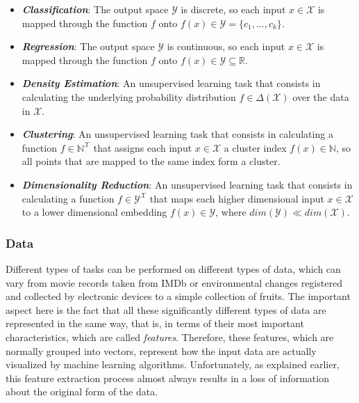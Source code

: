 \begin{itemize}
      \item \emph{\textbf{Classification}}: The output space $\mathcal{Y}$ is
            discrete, so each input $x \in \mathcal{X}$ is mapped through the function
            $f$ onto $f(x) \in \mathcal{Y}=\{c_1,...,c_k\}$.
      \item \emph{\textbf{Regression}}: The output space $\mathcal{Y}$ is continuous,
            so each input $x \in \mathcal{X}$ is mapped through the function $f$
            onto $f(x) \in \mathcal{Y} \subseteq \mathbb{R}$.
      \item \emph{\textbf{Density Estimation}}: An unsupervised learning task that
            consists in calculating the underlying probability distribution
            $f \in \Delta(\mathcal{X})$ over the data in $\mathcal{X}$.
      \item \emph{\textbf{Clustering}}: An unsupervised learning task that consists
            in calculating a function $f \in \mathbb{N}^{\mathcal{X}}$ that assigns
            each input $x \in \mathcal{X}$ a cluster index $f(x) \in \mathbb{N}$, so
            all points that are mapped to the same index form a cluster.
      \item \emph{\textbf{Dimensionality Reduction}}: An unsupervised learning task
            that consists in calculating a function $f \in \mathcal{Y}^{\mathcal{X}}$
            that maps each higher dimensional input $x \in \mathcal{X}$ to a lower
            dimensional embedding $f(x) \in \mathcal{Y}$, where
            $dim(\mathcal{Y}) \ll dim(\mathcal{X})$.
\end{itemize}

\subsubsection{Data}

Different types of tasks can be performed on different types of data, which can vary
from movie records taken from IMDb or environmental changes registered and collected by
electronic devices to a simple collection of fruits. The important aspect here is the fact
that all these significantly different types of data are represented in the same way,
that is, in terms of their most important characteristics, which are called
\emph{features}. Therefore, these features, which are normally grouped into vectors,
represent how the input data are actually visualized by machine learning algorithms.
Unfortunately, as explained earlier, this feature extraction process almost always
results in a loss of information about the original form of the data.

